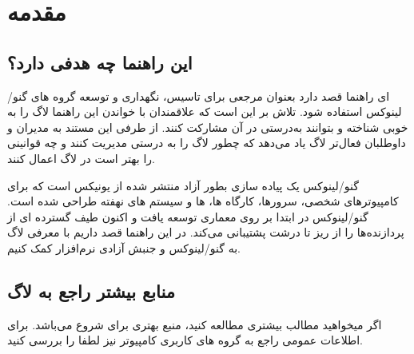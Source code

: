\section{مقدمه}

\subsection{این راهنما چه هدفی دارد؟}

ای راهنما قصد دارد بعنوان مرجعی برای تاسیس، نگهداری و توسعه گروه های گنو/لینوکس استفاده شود.
تلاش بر این است که علاقمندان با خواندن این راهنما لاگ را به خوبی شناخته و بتوانند به‌درستی در آن
مشارکت کنند. از طرفی این مستند به مدیران و داوطلبان فعال‌تر لاگ یاد می‌دهد که چطور لاگ را به درستی
مدیریت کنند و چه قوانینی را بهتر است در لاگ اعمال کنند.

گنو/لینوکس یک پیاده سازی بطور آزاد منتشر شده از یونیکس است که برای کامپیوترهای شخصی،
سرورها، کارگاه ها،  ها و سیستم های نهفته طراحی شده است.
گنو/لینوکس در ابتدا بر روی معماری  توسعه یافت و اکنون طیف گسترده ای از پردازنده‌ها
را از ریز تا درشت پشتیبانی می‌کند. در این راهنما قصد داریم با معرفی لاگ به گنو/لینوکس و جنبش
آزادی نرم‌افزار کمک کنیم.

%

\subsection{منابع بیشتر راجع به لاگ}

اگر میخواهید مطالب بیشتری مطالعه کنید،
منبع بهتری برای شروع می‌باشد. برای اطلاعات عمومی راجع به گروه های کاربری کامپیوتر نیز لطفا
را بررسی کنید.


